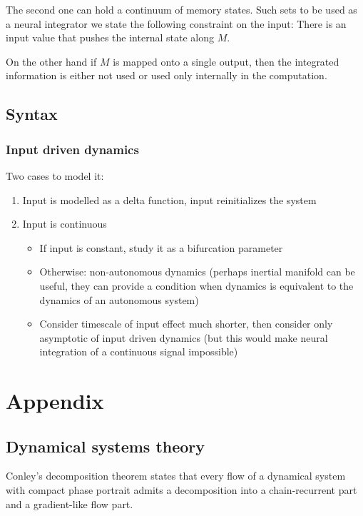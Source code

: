 \documentclass{scrartcl}
\theoremstyle{definition}
\theoremstyle{remark}
\begin{document}
The second one can hold a continuum of memory states. %
Such sets to be used as a neural integrator we state the following constraint on the input:
There is an input value that pushes the internal state along $M$.

On the other hand if $M$ is  mapped onto a single output, then the integrated information is either not used or used only internally in the computation.

\subsection{Syntax}%

\subsubsection{Input driven dynamics}
Two cases to model it:
\begin{enumerate}
\item Input is modelled as a delta function, input reinitializes the system
\item Input is continuous 
\begin{itemize}
\item If input is constant, study it as a bifurcation parameter
\item Otherwise: non-autonomous dynamics (perhaps inertial manifold can be useful, they can provide a condition when dynamics is equivalent to the dynamics of an autonomous system)
\item Consider timescale of input effect much shorter, then consider only asymptotic of input driven dynamics (but this would make neural integration of a continuous signal impossible)
\end{itemize}
\end{enumerate}


\section{Appendix}
\subsection{Dynamical systems theory}\label{sec:dst}

Conley's decomposition theorem states that every flow of a dynamical system with compact phase portrait admits a decomposition into a chain-recurrent part and a gradient-like flow part.
\end{document}
